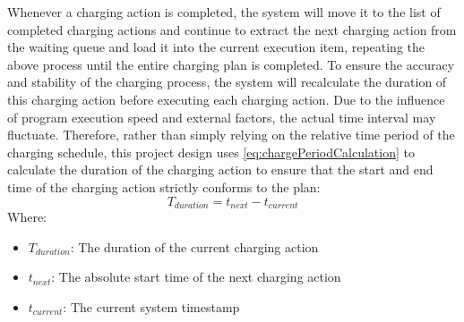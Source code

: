 \documentclass[
	english,
	ruledheaders=section,%
	class=report,%
	thesis={type=Report},%
	accentcolor=9c,%
	custommargins=true,%
	marginpar=false,%
	parskip=half-,%
	fontsize=11pt,%
	logofile={img/tuda_logo.pdf}, %
]{tudapub}
\begin{document}
\begin{enumerate}[label=\Alph*.]

    Whenever a charging action is completed, the system will move it to the list of completed charging actions and continue to extract the next charging action from the waiting queue and load it into the current execution item, repeating the above process until the entire charging plan is completed.
    To ensure the accuracy and stability of the charging process, the system will recalculate the duration of this charging action before executing each charging action. Due to the influence of program execution speed and external factors, the actual time interval may fluctuate. Therefore, rather than simply relying on the relative time period of the charging schedule, this project design uses \autoref{eq:chargePeriodCalculation} to calculate the duration of the charging action to ensure that the start and end time of the charging action strictly conforms to the plan:
    \begin{equation} 
    \label{eq:chargePeriodCalculation} 
        T_{duration} = t_{next} - t_{current}
    \end{equation}
    Where:
    \begin{itemize}
        \item $T_{duration}$: The duration of the current charging action
        \item $t_{next}$: The absolute start time of the next charging action
        \item $t_{current}$: The current system timestamp
    \end{itemize}

    

\end{enumerate}
\end{document}
